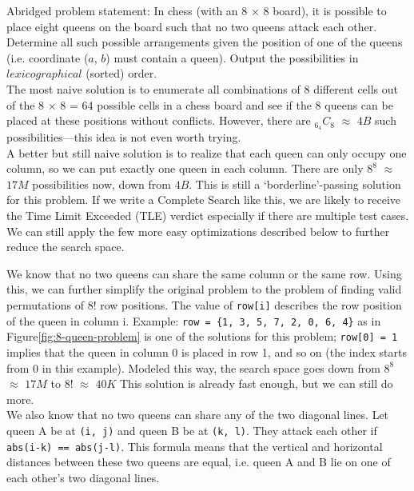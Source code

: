 Abridged problem statement: In chess (with an $8$ × $8$ board), it is possible to place eight queens on the board such that no two queens attack each other. Determine all such possible arrangements given the position of one of the queens (i.e. coordinate ($a$, $b$) must contain a queen). Output the possibilities in $lexicographical$ (sorted) order.
\\

\hspace{7mm}The most naive solution is to enumerate all combinations of 8 different cells out of the
8 × 8 = 64 possible cells in a chess board and see if the 8 queens can be placed at these positions without conflicts. However, there are $_6_4C_8$ $\approx$ $4B$ such possibilities—this idea is not even worth trying.
\\
 
\hspace{7mm}A better but still naive solution is to realize that each queen can only occupy one column, so we can put exactly one queen in each column. There are only $8^8$ $\approx$ $17M$ possibilities now,
down from $4B$. This is still a ‘borderline’-passing solution for this problem. If we write a Complete Search like this, we are likely to receive the Time Limit Exceeded (TLE) verdict especially if there are multiple test cases. We can still apply the few more easy optimizations described below to further reduce the search space.

\hspace{7mm}We know that no two queens can share the same column or the
same row. Using this, we can further simplify the original problem
to the problem of finding valid permutations of 8! row positions.
The value of \lstinline|row[i]| describes the row position of the queen in
column i. Example: \lstinline|row = {1, 3, 5, 7, 2, 0, 6, 4}| as in Figure\ref{fig:8-queen-problem} is one of the solutions for this problem;  \lstinline|row[0] = 1| implies that the queen in column 0 is placed in row 1, and so on (the index starts from 0 in this example). Modeled this way, the search space goes down from $8^8$ $\approx$ $17M$ to $8!$ $\approx$ $40K$  This solution is already fast enough, but we can still do more.
\\

\hspace{7mm}We also know that no two queens can share any of the two diagonal lines. Let queen A be at \lstinline|(i, j)| and queen B be at \lstinline|(k, l)|. They attack each other if \lstinline|abs(i-k) == abs(j-l)|. This formula means that the vertical and horizontal distances between these two queens are equal, i.e. queen A and B lie on one of each other’s two diagonal lines.
\\

